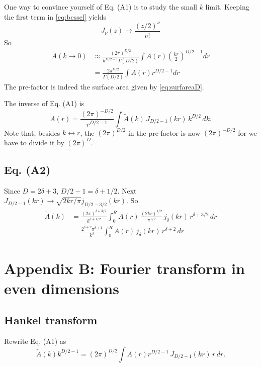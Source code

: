 \documentclass[aip,jcp,reprint,superscriptaddress]{revtex4-1}
\numberwithin{equation}{subsection}
\begin{document}
One way to convince yourself of Eq. (A1) is to study the small $k$ limit.
%
Keeping the first term in \eqref{eq:bessel} yields
\[
  J_\nu(z) \rightarrow \frac{ (z/2)^\nu }{ \nu! }
\]
So
%
\begin{align*}
\tilde A(k \rightarrow 0)
&\approx
\frac{ (2 \pi)^{D/2} } { k^{D/2 - 1} \Gamma(D/2) }
\int A(r) \left( \frac{k r}{2} \right)^{D/2 - 1} dr \\
&=
\frac{ 2 \pi^{D/2} } { \Gamma(D/2) }
\int A(r) r^{D/2 - 1} dr
\end{align*}
%
The pre-factor is indeed the surface area
given by \eqref{eq:surfareaD}.


The inverse of Eq. (A1) is
\begin{equation}
A(r)
=
\frac{ (2\pi)^{-D/2} } { r^{D/2 - 1} }
\int \tilde{A}(k) \, J_{D/2-1}(kr) \, k^{D/2} \, dk.
\label{eq:invftsphr}
\end{equation}
Note that, besides $k \leftrightarrow r$,
the $(2\pi)^{D/2}$ in the pre-factor is now $(2\pi)^{-D/2}$
for we have to divide it by $(2\pi)^D$.


\subsection{Eq. (A2)}

Since $D = 2\delta + 3$, $D/2 - 1 = \delta + 1/2$.
%
Next $J_{D/2-1}(kr) \rightarrow \sqrt{2 k r/\pi} j_{D/2-3/2} (kr)$.
%
So
\begin{align*}
\tilde A(k)
&=
\frac{ (2 \pi)^{\delta + 3/2} } { k^{\delta + 1/2} }
\int_0^R
  A(r) \, \frac{ (2kr)^{1/2} } { \pi^{1/2} } \,
  j_\delta(k r) \, r^{\delta + 3/2}\, dr \\
&=
  \frac{ 2^{\delta + 2} \pi^{\delta + 1} } { k^\delta }
\int_0^R
  A(r) \, j_\delta(k r) \, r^{\delta + 2} \, dr
\end{align*}



\section{Appendix B: Fourier transform in even dimensions}

\subsection{Hankel transform}

Rewrite Eq. (A1) as
\[
\tilde{A}(k) k^{D/2-1}
= (2 \pi)^{D/2}
\int A(r) r^{D/2-1} \, J_{D/2-1}(kr) \, r \, dr.
\]
\end{document}
